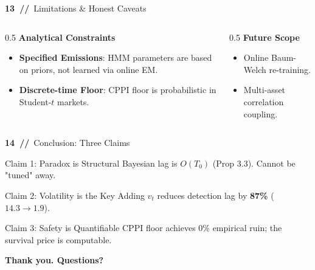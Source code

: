 \documentclass[11pt,aspectratio=169]{beamer}
\newcommand{\ca}[1]{\textcolor{bbamber}{\textbf{#1}}}
\begin{document}
\begin{frame}{\ca{13~//}~Limitations \& Honest Caveats}
  \begin{columns}[T]
    \begin{column}{0.5\textwidth}
      \ca{Analytical Constraints}
      \begin{itemize}
        \item \textbf{Specified Emissions}: HMM parameters are based on priors, not learned via online EM.
        \item \textbf{Discrete-time Floor}: CPPI floor is probabilistic in Student-$t$ markets.
      \end{itemize}
    \end{column}
    \begin{column}{0.5\textwidth}
      \ca{Future Scope}
      \begin{itemize}
        \item Online Baum-Welch re-training.
        \item Multi-asset correlation coupling.
      \end{itemize}
    \end{column}
  \end{columns}
\end{frame}

\begin{frame}{\ca{14~//}~Conclusion: Three Claims}
  \begin{block}{Claim 1: Paradox is Structural}
    Bayesian lag is $O(T_0)$ (Prop 3.3). Cannot be "tuned" away.
  \end{block}
  \begin{block}{Claim 2: Volatility is the Key}
    Adding $v_t$ reduces detection lag by \textbf{87\%} ($14.3 \to 1.9$).
  \end{block}
  \begin{block}{Claim 3: Safety is Quantifiable}
    CPPI floor achieves 0\% empirical ruin; the survival price is computable.
  \end{block}
  \vspace{0.8em}
  \centering\Large\ca{Thank you. Questions?}
\end{frame}
\end{document}
